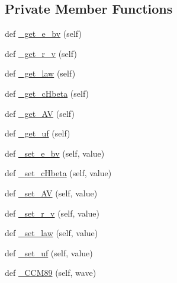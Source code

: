 \subsection*{Private Member Functions}
\begin{DoxyCompactItemize}
\item 
def \hyperlink{classpyneb_1_1extinction_1_1red__corr_1_1_red_corr_ad395ff01902fb0628788773a4e8271d3}{\+\_\+get\+\_\+e\+\_\+bv} (self)
\item 
def \hyperlink{classpyneb_1_1extinction_1_1red__corr_1_1_red_corr_a7004e35d4752299288216365df24f6e8}{\+\_\+get\+\_\+r\+\_\+v} (self)
\item 
def \hyperlink{classpyneb_1_1extinction_1_1red__corr_1_1_red_corr_a6757ba1278a16f504442c01766871c82}{\+\_\+get\+\_\+law} (self)
\item 
def \hyperlink{classpyneb_1_1extinction_1_1red__corr_1_1_red_corr_a25559a6ccb185970db8352003f5969a0}{\+\_\+get\+\_\+c\+Hbeta} (self)
\item 
def \hyperlink{classpyneb_1_1extinction_1_1red__corr_1_1_red_corr_a12af28f682582ba99d17d9d5f33ca1a3}{\+\_\+get\+\_\+\+A\+V} (self)
\item 
def \hyperlink{classpyneb_1_1extinction_1_1red__corr_1_1_red_corr_ac2a6eb966c52457c8b7209cf87ee3aff}{\+\_\+get\+\_\+uf} (self)
\item 
def \hyperlink{classpyneb_1_1extinction_1_1red__corr_1_1_red_corr_a8b9ff86d57c62a7ce2a3a257f73703f4}{\+\_\+set\+\_\+e\+\_\+bv} (self, value)
\item 
def \hyperlink{classpyneb_1_1extinction_1_1red__corr_1_1_red_corr_a54ec0d6ca9a2d8de20433951f2b62e74}{\+\_\+set\+\_\+c\+Hbeta} (self, value)
\item 
def \hyperlink{classpyneb_1_1extinction_1_1red__corr_1_1_red_corr_a39508e2a57b48e306e4514f0410b9414}{\+\_\+set\+\_\+\+A\+V} (self, value)
\item 
def \hyperlink{classpyneb_1_1extinction_1_1red__corr_1_1_red_corr_ad499e0702459bbc8547ddac79125965b}{\+\_\+set\+\_\+r\+\_\+v} (self, value)
\item 
def \hyperlink{classpyneb_1_1extinction_1_1red__corr_1_1_red_corr_a9b6fba4c3e9133d75cbbaf09c163bde3}{\+\_\+set\+\_\+law} (self, value)
\item 
def \hyperlink{classpyneb_1_1extinction_1_1red__corr_1_1_red_corr_aa3c87390e06478691997fc94ce3a5139}{\+\_\+set\+\_\+uf} (self, value)
\item 
def \hyperlink{classpyneb_1_1extinction_1_1red__corr_1_1_red_corr_a51dd4794e0a4f7f02382f424cad7e0f9}{\+\_\+\+C\+C\+M89} (self, wave)

\end{DoxyCompactItemize}
